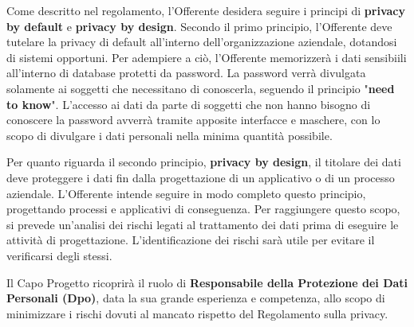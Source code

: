                     
                    Come descritto nel regolamento, l'Offerente desidera seguire i principi di \textbf{privacy by default} e \textbf{privacy by design}. Secondo il primo principio, l'Offerente deve tutelare la privacy di default all'interno dell'organizzazione aziendale, dotandosi di sistemi opportuni. Per adempiere a ciò, l'Offerente memorizzerà i dati sensibiili all'interno di database protetti da password. La password verrà divulgata solamente ai soggetti che necessitano di conoscerla, seguendo il principio "\textbf{need to know}". L'accesso ai dati da parte di soggetti che non hanno bisogno di conoscere la password avverrà tramite apposite interfacce e maschere, con lo scopo di divulgare i dati personali nella minima quantità possibile.
                    
                    
                    Per quanto riguarda il secondo principio, \textbf{privacy by design}, il titolare dei dati deve proteggere i dati fin dalla progettazione di un applicativo o di un processo aziendale.  L'Offerente intende seguire in modo completo questo principio, progettando processi e applicativi di conseguenza. Per raggiungere questo scopo, si prevede un'analisi dei rischi legati al trattamento dei dati prima di eseguire le attività di progettazione. L'identificazione dei rischi sarà utile per evitare il verificarsi degli stessi.

					
                    Il Capo Progetto ricoprirà il ruolo di \textbf{Responsabile della Protezione dei Dati Personali (Dpo)}, data la sua grande esperienza e competenza, allo scopo di minimizzare i rischi dovuti al mancato rispetto del Regolamento sulla privacy.
                	
